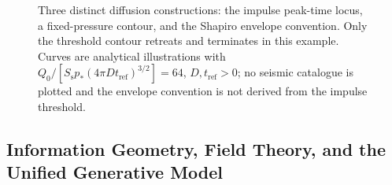 \begin{figure}[htbp]
  \centering
  \caption{Three distinct diffusion constructions: the impulse peak-time
    locus, a fixed-pressure contour, and the Shapiro envelope convention.
    Only the threshold contour retreats and terminates in this example.
    Curves are analytical illustrations with
    $Q_0/[S_{\mathrm s}p_*(4\pi Dt_{\mathrm{ref}})^{3/2}]=64$,
    $D,t_{\mathrm{ref}}>0$; no seismic catalogue is plotted and the
  envelope convention is not derived from the impulse threshold.}
  \label{fig:supp_diffusion_constructions}
\end{figure}

\subsection{Information Geometry, Field Theory, and the Unified
Generative Model}
\label{subsec:supp_info_thermo}


